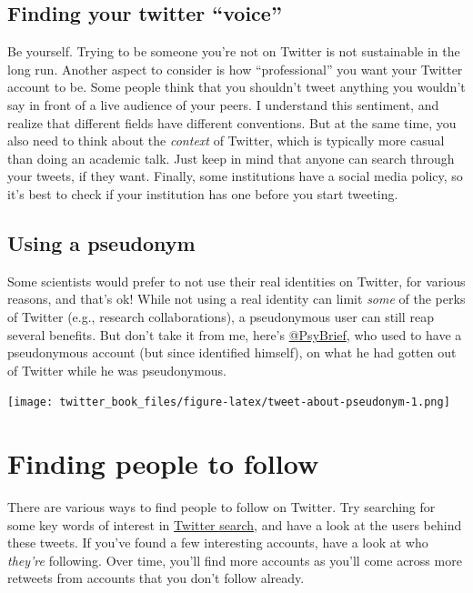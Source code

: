 \documentclass[
]{book}
\begin{document}
\hypertarget{finding-your-twitter-voice}{%
\subsection{Finding your twitter ``voice''}\label{finding-your-twitter-voice}}

Be yourself. Trying to be someone you're not on Twitter is not sustainable in the long run. Another aspect to consider is how ``professional'' you want your Twitter account to be. Some people think that you shouldn't tweet anything you wouldn't say in front of a live audience of your peers. I understand this sentiment, and realize that different fields have different conventions. But at the same time, you also need to think about the \emph{context} of Twitter, which is typically more casual than doing an academic talk. Just keep in mind that anyone can search through your tweets, if they want. Finally, some institutions have a social media policy, so it's best to check if your institution has one before you start tweeting.

\hypertarget{using-a-pseudonym}{%
\subsection{Using a pseudonym}\label{using-a-pseudonym}}

Some scientists would prefer to not use their real identities on Twitter, for various reasons, and that's ok! While not using a real identity can limit \emph{some} of the perks of Twitter (e.g., research collaborations), a pseudonymous user can still reap several benefits. But don't take it from me, here's \href{https://twitter.com/PsyBrief}{@PsyBrief}, who used to have a pseudonymous account (but since identified himself), on what he had gotten out of Twitter while he was pseudonymous.

\texttt{[image: twitter\_book\_files/figure-latex/tweet-about-pseudonym-1.png]}

\hypertarget{finding-people-to-follow}{%
\section*{Finding people to follow}\label{finding-people-to-follow}}

There are various ways to find people to follow on Twitter. Try searching for some key words of interest in \href{https://help.twitter.com/en/using-twitter/twitter-search}{Twitter search}, and have a look at the users behind these tweets. If you've found a few interesting accounts, have a look at who \emph{they're} following. Over time, you'll find more accounts as you'll come across more retweets from accounts that you don't follow already.
\end{document}
